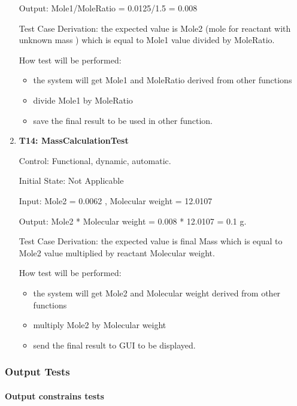 \documentclass[12pt, titlepage]{article}
\begin{document}
\begin{enumerate}
Output:  Mole1/MoleRatio = 0.0125/1.5 =  0.008

Test Case Derivation: the expected value is Mole2 (mole for reactant with unknown mass ) which is equal to Mole1 value divided by MoleRatio.  				
	
How test will be performed: 
\begin{itemize}
\item the system will get Mole1 and MoleRatio derived from other functions
\item divide Mole1 by MoleRatio  
\item save the final result to be used in other function.
\end{itemize}

\item{\bf T14: MassCalculationTest\\}

Control: Functional, dynamic, automatic.
					
Initial State: Not Applicable
					
Input: Mole2 = 0.0062  , Molecular weight = 12.0107
			
Output:  Mole2 * Molecular weight = 0.008 * 12.0107 = 0.1 g.

Test Case Derivation: the expected value is final Mass which is equal to Mole2 value multiplied by reactant Molecular weight.  				

How test will be performed: 
\begin{itemize}
\item the system will get Mole2 and Molecular weight derived from other functions
\item multiply Mole2 by Molecular weight  
\item send the final result to GUI to be displayed.
\end{itemize}

\end{enumerate}		


\subsubsection{Output Tests}

\paragraph{Output constrains tests}
\end{document}
